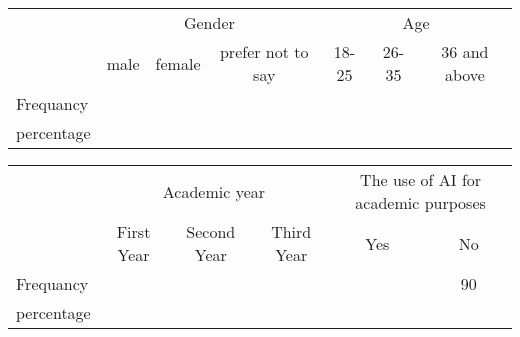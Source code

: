 \begin{table}[H]
	\begin{tabular}{l|ccc|ccc|}
		\cline{2-7}
		\multirow{2}{*}{}                & \multicolumn{3}{c|}{Gender} & \multicolumn{3}{c|}{Age}                                                                                                                      \\ \cline{2-7}
		                                 & \multicolumn{1}{c|}{male}   & \multicolumn{1}{c|}{female} & prefer not to say & \multicolumn{1}{c|}{18-25} & \multicolumn{1}{c|}{26-35} & \multicolumn{1}{c|}{36 and above} \\ \hline
		\multicolumn{1}{|l|}{Frequancy}  & \multicolumn{1}{c|}{}       & \multicolumn{1}{c|}{}       &                   & \multicolumn{1}{c|}{}      & \multicolumn{1}{c|}{}      & \multicolumn{1}{c|}{}             \\ \hline
		\multicolumn{1}{|l|}{percentage} & \multicolumn{1}{c|}{}       & \multicolumn{1}{c|}{}       &                   & \multicolumn{1}{c|}{}      & \multicolumn{1}{c|}{}      & \multicolumn{1}{c|}{}             \\ \hline
	\end{tabular}
\end{table}
\begin{table}[H]
	\begin{tabular}{l|ccc|cc|}
		\cline{2-6}
		\multirow{2}{*}{}                & \multicolumn{3}{c|}{Academic year} & \multicolumn{2}{c|}{The use of AI for academic purposes}                                                                   \\ \cline{2-6}
		                                 & \multicolumn{1}{c|}{First Year}    & \multicolumn{1}{c|}{Second Year}                 & Third Year & \multicolumn{1}{c|}{Yes} & \multicolumn{1}{c|}{No} \\ \hline
		\multicolumn{1}{|l|}{Frequancy}  & \multicolumn{1}{c|}{}              & \multicolumn{1}{c|}{}                            &            & \multicolumn{1}{c|}{}    & \multicolumn{1}{c|}{90} \\ \hline
		\multicolumn{1}{|l|}{percentage} & \multicolumn{1}{c|}{}              & \multicolumn{1}{c|}{}                            &            & \multicolumn{1}{c|}{}    & \multicolumn{1}{c|}{}   \\ \hline
	\end{tabular}
\end{table}


